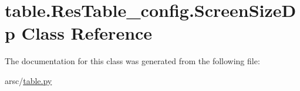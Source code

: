 \hypertarget{classtable_1_1ResTable__config_1_1ScreenSizeDp}{}\section{table.\+Res\+Table\+\_\+config.\+Screen\+Size\+Dp Class Reference}
\label{classtable_1_1ResTable__config_1_1ScreenSizeDp}


The documentation for this class was generated from the following file\+:\begin{DoxyCompactItemize}
\item 
arsc/\mbox{\hyperlink{table_8py}{table.\+py}}\end{DoxyCompactItemize}

